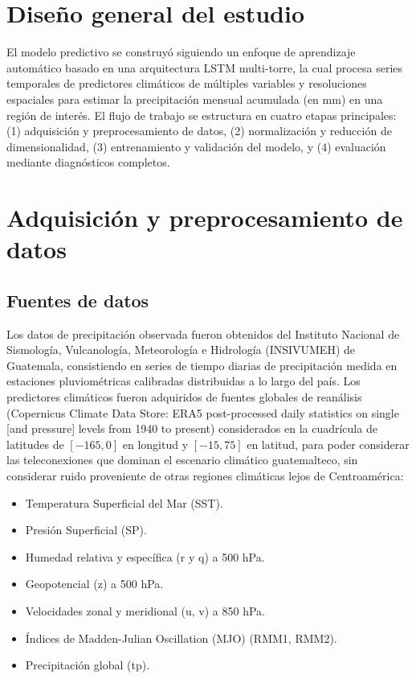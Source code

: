 \section{Diseño general del estudio}
\label{sec:disenio_general}

El modelo predictivo se construyó siguiendo un enfoque de aprendizaje automático basado en una arquitectura LSTM multi-torre, la cual procesa series temporales de predictores climáticos de múltiples variables y resoluciones espaciales para estimar la precipitación mensual acumulada (en mm) en una región de interés. El flujo de trabajo se estructura en cuatro etapas principales: (1) adquisición y preprocesamiento de datos, (2) normalización y reducción de dimensionalidad, (3) entrenamiento y validación del modelo, y (4) evaluación mediante diagnósticos completos.

\section{Adquisición y preprocesamiento de datos}
\label{sec:adquisicion_datos}

\subsection{Fuentes de datos}
Los datos de precipitación observada fueron obtenidos del Instituto Nacional de Sismología, Vulcanología, Meteorología e Hidrología (INSIVUMEH) de Guatemala, consistiendo en series de tiempo diarias de precipitación medida en estaciones pluviométricas calibradas distribuidas a lo largo del país. Los predictores climáticos fueron adquiridos de fuentes globales de reanálisis (Copernicus Climate Data Store: ERA5 post-processed daily statistics on single [and pressure] levels from 1940 to present) considerados en la cuadrícula de latitudes de $[-165, 0]$ en longitud y $[-15, 75]$ en latitud, para poder considerar las teleconexiones que dominan el escenario climático guatemalteco, sin considerar ruido proveniente de otras regiones climáticas lejos de Centroamérica:

\begin{itemize}
    \item Temperatura Superficial del Mar (SST).
    \item Presión Superficial (SP).
    \item Humedad relativa y específica (r y q) a 500 hPa. 
    \item Geopotencial (z) a 500 hPa. 
    \item Velocidades zonal y meridional (u, v) a 850 hPa. 
    \item Índices de Madden-Julian Oscillation (MJO) (RMM1, RMM2).
    \item Precipitación global (tp).
\end{itemize}

